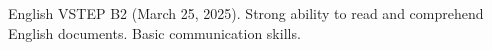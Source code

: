 
\begin{cvskills}

  \cvskill
    {English} %
    {VSTEP B2 (March 25, 2025). Strong ability to read and comprehend English documents. Basic communication skills.} %


\end{cvskills}

